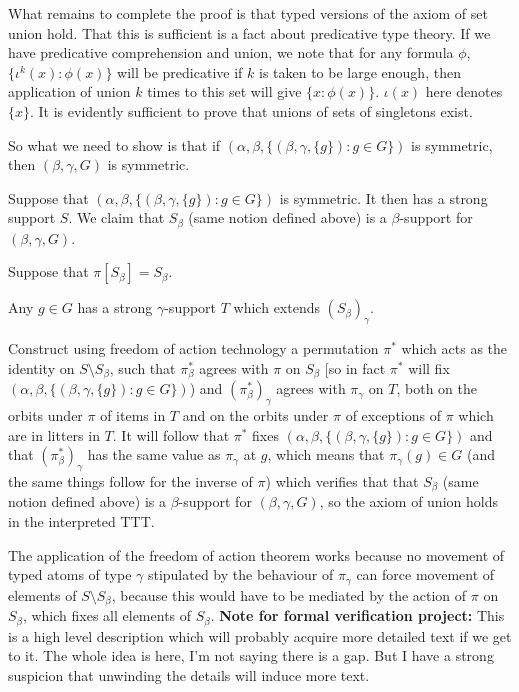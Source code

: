 What remains to complete the proof is that typed versions of the axiom of set union hold.  That this is sufficient is a fact about predicative type theory.
If we have predicative comprehension and union, we note that for any formula $\phi$, $\{\iota^k(x):\phi(x)\}$ will be predicative if $k$ is taken to be large enough, then application of union $k$ times to this set will give $\{x:\phi(x)\}$.  $\iota(x)$ here denotes $\{x\}$.  It is evidently sufficient to prove that unions of sets of singletons exist.

So what we need to show is that if $(\alpha,\beta,\{(\beta,\gamma,\{g\}):g \in G\})$ is symmetric, then $(\beta,\gamma,G)$ is symmetric.

Suppose that $(\alpha,\beta,\{(\beta,\gamma,\{g\}):g \in G\})$ is symmetric.  It then has a strong support $S$.  We claim that $S_\beta$ (same notion defined above) is a $\beta$-support for $(\beta,\gamma,G)$.

Suppose that $\pi[S_\beta]=S_\beta$.

Any $g \in G$ has a strong $\gamma$-support $T$ which extends $(S_\beta)_\gamma$.

Construct using freedom of action technology a permutation $\pi^*$ which acts as the identity on $S \setminus S_\beta$, such that $\pi^*_\beta$ agrees with $\pi$ on $S_\beta$ [so in fact $\pi^*$ will fix $(\alpha,\beta,\{(\beta,\gamma,\{g\}):g \in G\})$) and $(\pi^*_\beta)_\gamma$ agrees with $\pi_\gamma$ on $T$, both on the orbits under $\pi$ of items in $T$ and on the orbits under $\pi$ of exceptions of $\pi$ which are in litters in $T$.  It will follow that $\pi^*$ fixes $(\alpha,\beta,\{(\beta,\gamma,\{g\}):g \in G\})$ and that $(\pi^*_\beta)_\gamma$ has the same value as $\pi_\gamma$ at $g$, which means that $\pi_\gamma(g) \in G$ (and the same things follow for the inverse of $\pi$) which verifies that that $S_\beta$ (same notion defined above) is a $\beta$-support for $(\beta,\gamma,G)$, so the axiom of union holds in the interpreted TTT.

The application of the freedom of action theorem works because no movement of typed atoms of type $\gamma$ stipulated by the behaviour of $\pi_\gamma$ can force
movement of elements of $S \setminus S_\beta$, because this would have to be mediated by the action of $\pi$ on $S_\beta$, which fixes all elements of $S_\beta$.
{\bf Note for formal verification project:}  This is a high level description which will probably acquire more detailed text if we get to it.  The whole idea is here, I'm not saying there is a gap.  But I have a strong suspicion that unwinding the details will induce more text.

